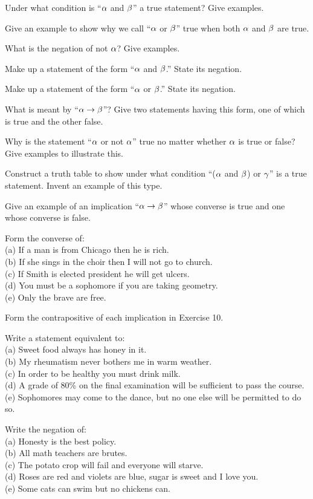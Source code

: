 \documentclass[11pt]{book}
\begin{document}
\begin{exlist}
\item Under what condition is ``$\alpha$ and $\beta$'' a true statement? Give examples.
\item Give an example to show why we call ``$\alpha$ or $\beta$'' true when both $\alpha$
      and $\beta$ are true.
\item What is the negation of not $\alpha$? Give examples.
\item Make up a statement of the form ``$\alpha$ and $\beta$.'' State its negation.
\item Make up a statement of the form ``$\alpha$ or $\beta$.'' State its negation.
\item What is meant by ``$\alpha \rightarrow \beta$''? Give two statements having this form,
      one of which is true and the other false.
\item Why is the statement ``$\alpha$ or not $\alpha$'' true no matter whether $\alpha$ is
      true or false? Give examples to illustrate this.
\item[\stex 8.] Construct a truth table to show under what condition
      ``($\alpha$ and $\beta$) or $\gamma$'' is a true statement. Invent an example of
      this type.
\item[9.] Give an example of an implication ``$\alpha \rightarrow \beta$'' whose converse is
      true and one whose converse is false.
\item Form the converse of:\\
      (a) If a man is from Chicago then he is rich.\\
      (b) If she sings in the choir then I will not go to church.\\
      (c) If Smith is elected president he will get ulcers.\\
      (d) You must be a sophomore if you are taking geometry.\\
      (e) Only the brave are free.
\item Form the contrapositive of each implication in Exercise 10.
\item Write a statement equivalent to:\\
      (a) Sweet food always has honey in it.\\
      (b) My rheumatism never bothers me in warm weather.\\
      (c) In order to be healthy you must drink milk.\\
      (d) A grade of 80\% on the final examination will be sufficient to pass the
      course.\\
      (e) Sophomores may come to the dance, but no one else will be permitted to
      do so.
\item Write the negation of:\\
      (a) Honesty is the best policy.\\
      (b) All math teachers are brutes.\\
      (c) The potato crop will fail and everyone will starve.\\
      (d) Roses are red and violets are blue, sugar is sweet and I love you.\\
      (e) Some cats can swim but no chickens can.
\end{exlist}
\end{document}
